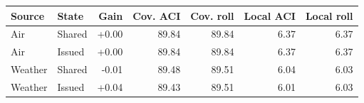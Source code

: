 \begin{tabular}{llrrrrr}
\toprule
Source & State & Gain & Cov. ACI & Cov. roll & Local ACI & Local roll \\
\midrule
Air & Shared & +0.00 & 89.84 & 89.84 & 6.37 & 6.37 \\
Air & Issued & +0.00 & 89.84 & 89.84 & 6.37 & 6.37 \\
Weather & Shared & -0.01 & 89.48 & 89.51 & 6.04 & 6.03 \\
Weather & Issued & +0.04 & 89.43 & 89.51 & 6.01 & 6.03 \\
\bottomrule
\end{tabular}
